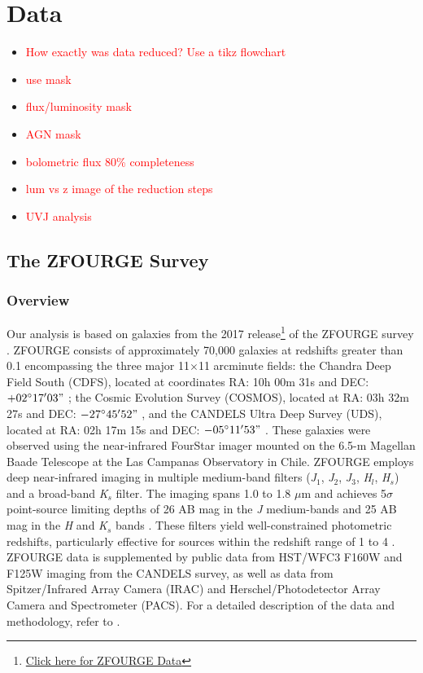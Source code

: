 \chapter{Data}
\thispagestyle{empty}

\begin{itemize}
    \item \textcolor{red}{How exactly was data reduced? Use a tikz flowchart}
    \item \textcolor{red}{use mask}
    \item \textcolor{red}{flux/luminosity mask}
    \item \textcolor{red}{AGN mask}
    \item \textcolor{red}{bolometric flux 80\% completeness}
    \item \textcolor{red}{lum vs z image of the reduction steps}
    \item \textcolor{red}{UVJ analysis}
\end{itemize}

\section{The ZFOURGE Survey}
\subsection{Overview} \label{Sec: ZFOURGE Overview}
Our analysis is based on galaxies from the 2017 release\footnote{\href{http://vizier.cds.unistra.fr/viz-bin/VizieR?-source=J/ApJ/830/51&-to=2}{Click here for ZFOURGE Data}} of the ZFOURGE survey \citep{straatman_fourstar_2016}. ZFOURGE consists of approximately 70,000 galaxies at redshifts greater than 0.1 encompassing the three major 11$\times$11 arcminute fields: the Chandra Deep Field South (CDFS), located at coordinates RA: 10h 00m 31s and DEC: $+02^\circ 17' 03"$ \citep{giacconi_chandra_2002}; the Cosmic Evolution Survey (COSMOS), located at RA: 03h 32m 27s and DEC: $-27^\circ 45' 52"$ \citep{scoville_cosmic_2007}, and the CANDELS Ultra Deep Survey (UDS), located at RA: 02h 17m 15s and DEC: $-05^\circ 11' 53"$ \citep{lawrence_ukirt_2007}. These galaxies were observed using the near-infrared FourStar imager \citep{persson_fourstar_2013} mounted on the 6.5-m Magellan Baade Telescope at the Las Campanas Observatory in Chile. ZFOURGE employs deep near-infrared imaging in multiple medium-band filters (\textit{J}$_{1}$, \textit{J}$_2$, \textit{J}$_{3}$, \textit{H}$_{l}$, \textit{H}$_{s}$) and a broad-band \textit{K}$_{s}$ filter. The imaging spans 1.0 to 1.8 $\mu$m and achieves 5$\sigma$ point-source limiting depths of 26 AB mag in the \textit{J} medium-bands and 25 AB mag in the \textit{H} and \textit{K}$_{s}$ bands \citep{spitler_first_2012}. These filters yield well-constrained photometric redshifts, particularly effective for sources within the redshift range of 1 to 4 \citep{spitler_first_2012}. ZFOURGE data is supplemented by public data from HST/WFC3 F160W and F125W imaging from the CANDELS survey, as well as data from Spitzer/Infrared Array Camera (IRAC) and Herschel/Photodetector Array Camera and Spectrometer (PACS). For a detailed description of the data and methodology, refer to \cite{straatman_fourstar_2016}.

